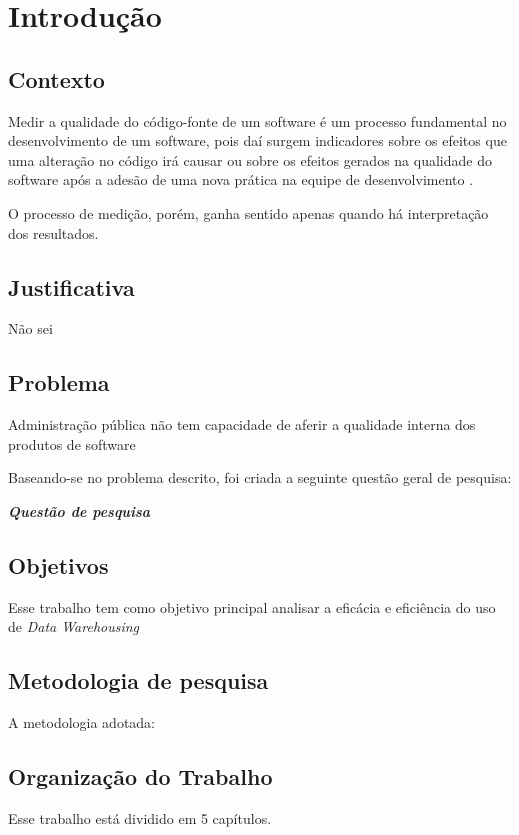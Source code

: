 \chapter{Introdução}

\section{Contexto}

Medir a qualidade do código-fonte  de um software é um processo fundamental no desenvolvimento de um software, pois daí surgem indicadores sobre os efeitos que uma alteração no código irá causar ou sobre os efeitos gerados na qualidade do software após a adesão de uma nova prática na equipe de desenvolvimento \cite{Fenton98}.

O processo de medição, porém, ganha sentido apenas quando há interpretação dos resultados.


\section{Justificativa}

Não sei

\section{Problema}

Administração pública não tem capacidade de aferir a qualidade interna dos produtos de software

Baseando-se no problema descrito, foi criada a seguinte questão geral de pesquisa:

\textbf{\textit{Questão de pesquisa }}

\section{Objetivos}

Esse trabalho tem como objetivo principal analisar a eficácia e eficiência do uso de \textit{Data Warehousing} 

\section{Metodologia de pesquisa}

A metodologia adotada:

\section{Organização do Trabalho}

Esse trabalho está dividido em 5 capítulos. 

